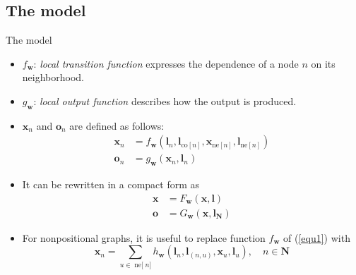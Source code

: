 \documentclass[10pt,aspectratio=169]{beamer}
\begin{document}
\subsection{The model}
\begin{frame}[allowframebreaks]{The model}

\begin{itemize}
    \item $f_{\boldsymbol{w}}$: \emph{local transition function} expresses the dependence of a node $n$ on its neighborhood.
    \item $g_{\boldsymbol{w}}$: \emph{local output function} describes how the output is produced.
    \item $\boldsymbol{x}_n$ and $\boldsymbol{o}_{n}$ are defined as follows:
    \begin{equation}
        \label{equ1}        
        \begin{aligned}
            \boldsymbol{x}_{n} &=f_{\boldsymbol{w}}\left(\boldsymbol{l}_{n}, \boldsymbol{l}_{\mathrm{co}[n]}, \boldsymbol{x}_{\mathrm{ne}[n]}, \boldsymbol{l}_{\mathrm{ne}[n]}\right) \\
            \boldsymbol{o}_{n} &=g_{\boldsymbol{w}}\left(\boldsymbol{x}_{n}, \boldsymbol{l}_{n}\right)
        \end{aligned}
    \end{equation}
\end{itemize}

\framebreak

\begin{itemize}
    \item It can be rewritten in a compact form as
    \begin{equation}
        \label{equ2}
        \begin{aligned}
            \boldsymbol{x}&=F_{\boldsymbol{w}}(\boldsymbol{x}, \boldsymbol{l}) \\
            \boldsymbol{o}&=G_{\boldsymbol{w}}\left(\boldsymbol{x}, \boldsymbol{l}_{\boldsymbol{N}}\right)
        \end{aligned}            
    \end{equation}
    \item For nonpositional graphs, it is useful to replace function $f_{\boldsymbol{w}}$
    of (\ref{equ1}) with
    \begin{equation}
        \label{equ3}   
        \boldsymbol{x}_{n}=\sum_{u \in \operatorname{ne[} n]} h_{\boldsymbol{w}}\left(\boldsymbol{l}_{n}, \boldsymbol{l}_{(n, u)}, \boldsymbol{x}_{u}, \boldsymbol{l}_{u}\right), \quad n \in \boldsymbol{N}
    \end{equation}
\end{itemize}


\end{frame}
\end{document}
